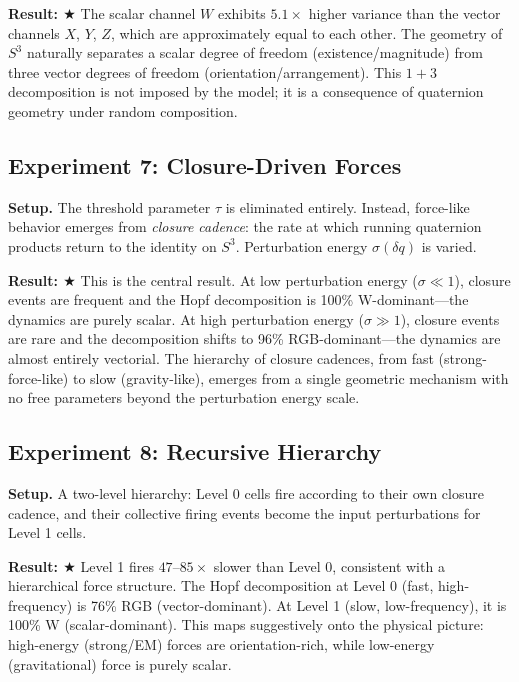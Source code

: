 \documentclass[letterpaper,12pt]{article}
\begin{document}
\textbf{Result: $\bigstar$} The scalar channel $W$ exhibits $5.1\times$ higher variance than the vector channels $X$, $Y$, $Z$, which are approximately equal to each other. The geometry of $S^3$ naturally separates a scalar degree of freedom (existence/magnitude) from three vector degrees of freedom (orientation/arrangement). This $1+3$ decomposition is not imposed by the model; it is a consequence of quaternion geometry under random composition.

\subsection{Experiment 7: Closure-Driven Forces}

\textbf{Setup.} The threshold parameter $\tau$ is eliminated entirely. Instead, force-like behavior emerges from \emph{closure cadence}: the rate at which running quaternion products return to the identity on $S^3$. Perturbation energy $\sigma(\delta q)$ is varied.

\textbf{Result: $\bigstar$} This is the central result. At low perturbation energy ($\sigma \ll 1$), closure events are frequent and the Hopf decomposition is 100\% W-dominant---the dynamics are purely scalar. At high perturbation energy ($\sigma \gg 1$), closure events are rare and the decomposition shifts to 96\% RGB-dominant---the dynamics are almost entirely vectorial. The hierarchy of closure cadences, from fast (strong-force-like) to slow (gravity-like), emerges from a single geometric mechanism with no free parameters beyond the perturbation energy scale.

\subsection{Experiment 8: Recursive Hierarchy}

\textbf{Setup.} A two-level hierarchy: Level 0 cells fire according to their own closure cadence, and their collective firing events become the input perturbations for Level 1 cells.

\textbf{Result: $\bigstar$} Level 1 fires $47$--$85\times$ slower than Level 0, consistent with a hierarchical force structure. The Hopf decomposition at Level 0 (fast, high-frequency) is 76\% RGB (vector-dominant). At Level 1 (slow, low-frequency), it is 100\% W (scalar-dominant). This maps suggestively onto the physical picture: high-energy (strong/EM) forces are orientation-rich, while low-energy (gravitational) force is purely scalar.
\end{document}
